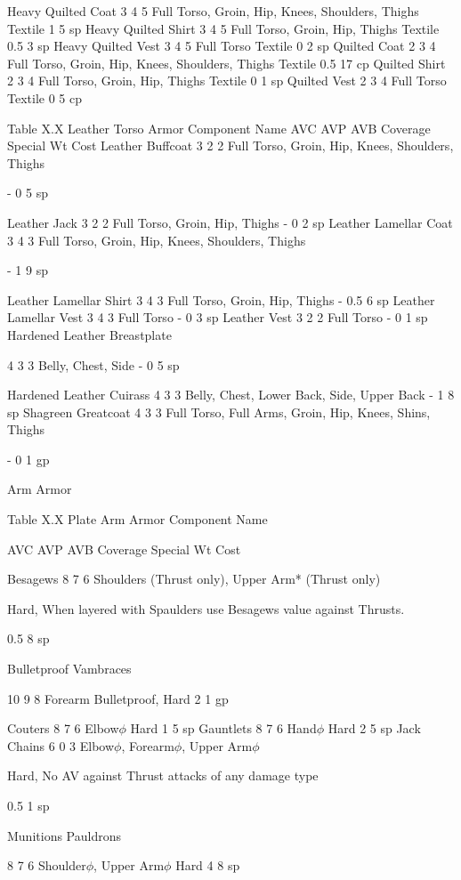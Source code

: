 \documentclass[oneside,11pt,english]{book}
\begin{document}
Heavy Quilted Coat 3 4 5 Full Torso, Groin, Hip, Knees, Shoulders, Thighs Textile 1 5 sp 
Heavy Quilted Shirt 3 4 5 Full Torso, Groin, Hip, Thighs Textile 0.5 3 sp 
Heavy Quilted Vest 3 4 5 Full Torso Textile 0 2 sp 
Quilted Coat 2 3 4 Full Torso, Groin, Hip, Knees, Shoulders, Thighs Textile 0.5 17 cp 
Quilted Shirt 2 3 4 Full Torso, Groin, Hip, Thighs Textile 0 1 sp 
Quilted Vest 2 3 4 Full Torso Textile 0 5 cp 

 
Table X.X Leather Torso Armor 
Component Name AVC AVP AVB Coverage Special Wt Cost 
Leather Buffcoat 3 2 2 Full Torso, Groin, Hip, Knees, Shoulders, 
Thighs 

- 0 5 sp 

Leather Jack 3 2 2 Full Torso, Groin, Hip, Thighs - 0 2 sp 
Leather Lamellar Coat 3 4 3 Full Torso, Groin, Hip, Knees, Shoulders, 
Thighs 

- 1 9 sp 

Leather Lamellar Shirt 3 4 3 Full Torso, Groin, Hip, Thighs - 0.5 6 sp 
Leather Lamellar Vest 3 4 3 Full Torso - 0 3 sp 
Leather Vest 3 2 2 Full Torso - 0 1 sp 
Hardened Leather 
Breastplate 

4 3 3 Belly, Chest, Side - 0 5 sp 

Hardened Leather Cuirass 4 3 3 Belly, Chest, Lower Back, Side, Upper Back - 1 8 sp 
Shagreen Greatcoat 4 3 3 Full Torso, Full Arms, Groin, Hip, Knees, Shins, 
Thighs 

- 0 1 gp 

 

Arm Armor 

 
Table X.X Plate Arm Armor 
Component 
Name 

AVC AVP AVB Coverage Special Wt Cost 

Besagews 8 7 6 Shoulders (Thrust only), 
Upper Arm* (Thrust only) 

Hard, When layered with Spaulders use 
Besagews value against Thrusts. 

0.5 8 sp 

Bulletproof 
Vambraces 

10 9 8 Forearm Bulletproof, Hard 2 1 gp 

Couters 8 7 6 Elbow$\phi$ Hard 1 5 sp 
Gauntlets 8 7 6 Hand$\phi$ Hard 2 5 sp 
Jack Chains 6 0 3 Elbow$\phi$, Forearm$\phi$, Upper 
Arm$\phi$ 

Hard, No AV against Thrust attacks of 
any damage type 

0.5 1 sp 


Munitions 
Pauldrons 

8 7 6 Shoulder$\phi$, Upper Arm$\phi$ Hard 4 8 sp 
\end{document}
